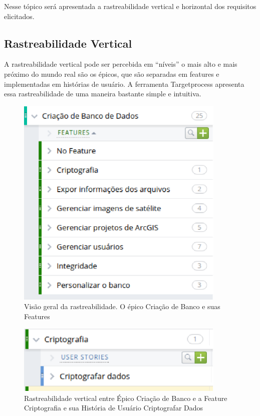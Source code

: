   Nesse tópico será apresentada a rastreabilidade vertical e horizontal dos requisitos elicitados.

\subsection{Rastreabilidade Vertical}

A rastreabilidade vertical pode ser percebida em “níveis” o mais alto e mais próximo do mundo real são os épicos, que são separadas em features e implementadas em histórias de usuário. A ferramenta Targetprocess apresenta essa rastreabilidade de uma maneira bastante simple e intuitiva.

\begin{figure}[!htb]
    \centering
    \includegraphics[width=10cm, keepaspectratio=false]{figuras/rastreabilidade/vertical/features.eps}
    \caption{Visão geral da rastreabilidade. O épico Criação de Banco e suas Features}
  \end{figure}

  \begin{figure}[!htb]
    \centering
    \includegraphics[width=10cm, keepaspectratio=false]{figuras/rastreabilidade/vertical/feature_criptografia.eps}
    \caption{Rastreabilidade vertical entre Épico Criação de Banco e a Feature Criptografia e sua História de Usuário Criptografar Dados}
  \end{figure}

